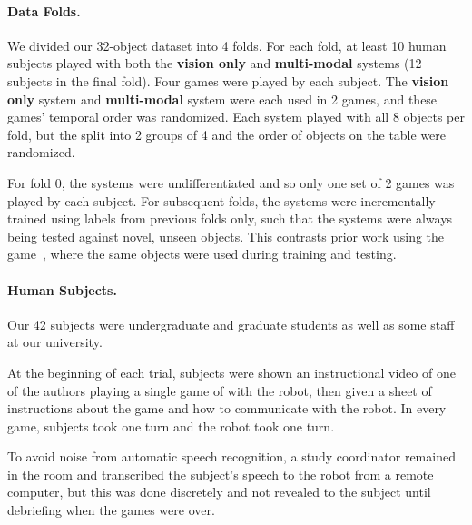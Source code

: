 \paragraph{Data Folds.}
We divided our 32-object dataset into 4 folds.
For each fold, at least 10 human subjects played \ispy with both the \textbf{vision only} and \textbf{multi-modal} systems (12 subjects in the final fold).
Four games were played by each subject.
The \textbf{vision only} system and \textbf{multi-modal} system were each used in 2 games, and these games' temporal order was randomized.
Each system played with all 8 objects per fold, but the split into 2 groups of 4 and the order of objects on the table were randomized.

For fold 0, the systems were undifferentiated and so only one set of 2 games was played by each subject. 
For subsequent folds, the systems were incrementally trained using labels from previous folds only, such that the systems were always being tested against novel, unseen objects.
This contrasts prior work using the \ispy game~\cite{parde:ijcai15}, where the same objects were used during training and testing.

\paragraph{Human Subjects.}

Our 42 subjects were undergraduate and graduate students as well as some staff at our university.

At the beginning of each trial, subjects were shown an instructional video of one of the authors playing a single game of \ispy with the robot, then given a sheet of instructions about the game and how to communicate with the robot. 
In every game, subjects took one turn and the robot took one turn.

To avoid noise from automatic speech recognition, a study coordinator remained in the room and transcribed the subject's speech to the robot from a remote computer, but this was done discretely and not revealed to the subject until debriefing when the games were over.
